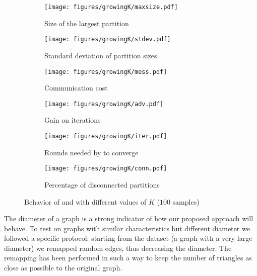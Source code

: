 \begin{figure*}[!ht]
\setlength{\belowcaptionskip}{-5pt}
\captionsetup[subfigure]{skip=-12pt}

\begin{subfigure}[b]{0.45\textwidth}
\texttt{[image: figures/growingK/maxsize.pdf]}
\caption{Size of the largest partition}
\label{fig:growingK-maxsize}
\end{subfigure}
\hfill
\begin{subfigure}[b]{0.45\textwidth}
\texttt{[image: figures/growingK/stdev.pdf]}
\caption{Standard deviation of partition sizes}
\label{fig:growingK-stdev}
\end{subfigure}

\vspace{-5pt}
\begin{subfigure}[b]{0.45\textwidth}
\texttt{[image: figures/growingK/mess.pdf]}
\caption{Communication cost}
\label{fig:growingK-mess}
\end{subfigure}
\hfill
\begin{subfigure}[b]{0.45\textwidth}
\texttt{[image: figures/growingK/adv.pdf]}
\caption{Gain on iterations}
\label{fig:growingK-adv}
\end{subfigure}

\vspace{-5pt}
\begin{subfigure}[b]{0.45\textwidth}
\texttt{[image: figures/growingK/iter.pdf]}
\caption{Rounds needed by \dfep to converge}
\label{fig:growingK-iter}
\end{subfigure}
\hfill
\begin{subfigure}[b]{0.45\textwidth}
\texttt{[image: figures/growingK/conn.pdf]}
\caption{Percentage of disconnected partitions}
\label{fig:growingK-conn}
\end{subfigure}

\caption{Behavior of \dfep and \dfepc with different values of $K$ ($100$ samples)}
\label{fig:growingK}
\end{figure*}

The diameter of a graph is a strong indicator of how our proposed approach will 
behave. To test \dfep on graphs with similar characteristics but different diameter 
we followed a specific protocol: starting from the  dataset (a graph with 
a very large diameter) we remapped random edges, thus decreasing the diameter. The
remapping has been performed in such a way to keep the number of triangles as close
as possible to the original graph. 

